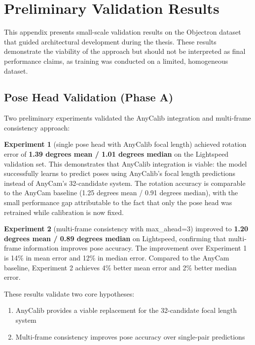 
\chapter{Preliminary Validation Results}\label{chapter:preliminary-results}

This appendix presents small-scale validation results on the Objectron dataset that guided architectural development during the thesis. These results demonstrate the viability of the approach but should not be interpreted as final performance claims, as training was conducted on a limited, homogeneous dataset.

\section{Pose Head Validation (Phase A)}\label{sec:app-exp-1-2}

Two preliminary experiments validated the AnyCalib integration and multi-frame consistency approach:

\textbf{Experiment 1} (single pose head with AnyCalib focal length) achieved rotation error of \textbf{1.39 degrees mean / 1.01 degrees median} on the Lightspeed validation set. This demonstrates that AnyCalib integration is viable: the model successfully learns to predict poses using AnyCalib's focal length predictions instead of AnyCam's 32-candidate system. The rotation accuracy is comparable to the AnyCam baseline (1.25 degrees mean / 0.91 degrees median), with the small performance gap attributable to the fact that only the pose head was retrained while calibration is now fixed.

\textbf{Experiment 2} (multi-frame consistency with max\_ahead=3) improved to \textbf{1.20 degrees mean / 0.89 degrees median} on Lightspeed, confirming that multi-frame information improves pose accuracy. The improvement over Experiment 1 is 14\% in mean error and 12\% in median error. Compared to the AnyCam baseline, Experiment 2 achieves 4\% better mean error and 2\% better median error.

These results validate two core hypotheses:
\begin{enumerate}
    \item AnyCalib provides a viable replacement for the 32-candidate focal length system
    \item Multi-frame consistency improves pose accuracy over single-pair predictions
\end{enumerate}

